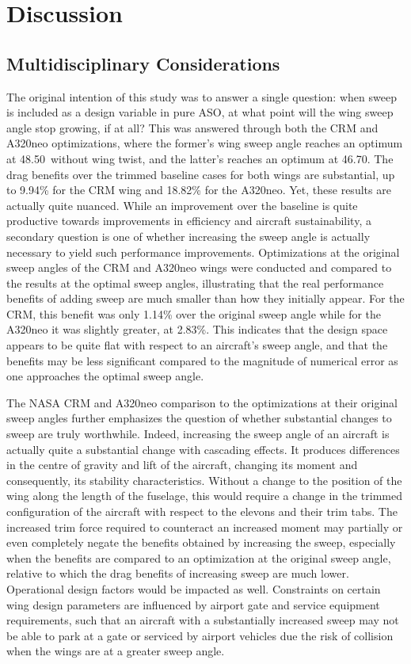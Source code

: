 \chapter{Discussion}
\section{Multidisciplinary Considerations}
The original intention of this study was to answer a single question: when sweep is included as a design variable in pure ASO, at what point will the wing sweep angle stop growing, if at all? This was answered through both the CRM and A320neo optimizations, where the former's wing sweep angle reaches an optimum at 48.50\degree\ without wing twist, and the latter's reaches an optimum at 46.70\degree. The drag benefits over the trimmed baseline cases for both wings are substantial, up to 9.94\% for the CRM wing and 18.82\% for the A320neo. Yet, these results are actually quite nuanced. While an improvement over the baseline is quite productive towards improvements in efficiency and aircraft sustainability, a secondary question is one of whether increasing the sweep angle is actually necessary to yield such performance improvements. Optimizations at the original sweep angles of the CRM and A320neo wings were conducted and compared to the results at the optimal sweep angles, illustrating that the real performance benefits of adding sweep are much smaller than how they initially appear. For the CRM, this benefit was only 1.14\% over the original sweep angle while for the A320neo it was slightly greater, at 2.83\%. This indicates that the design space appears to be quite flat with respect to an aircraft's sweep angle, and that the benefits may be less significant compared to the magnitude of numerical error as one approaches the optimal sweep angle.

The NASA CRM and A320neo comparison to the optimizations at their original sweep angles further emphasizes the question of whether substantial changes to sweep are truly worthwhile. Indeed, increasing the sweep angle of an aircraft is actually quite a substantial change with cascading effects. It produces differences in the centre of gravity and lift of the aircraft, changing its moment and consequently, its stability characteristics. Without a change to the position of the wing along the length of the fuselage, this would require a change in the trimmed configuration of the aircraft with respect to the elevons and their trim tabs. The increased trim force required to counteract an increased moment may partially or even completely negate the benefits obtained by increasing the sweep, especially when the benefits are compared to an optimization at the original sweep angle, relative to which the drag benefits of increasing sweep are much lower. Operational design factors would be impacted as well. Constraints on certain wing design parameters are influenced by airport gate and service equipment requirements, such that an aircraft with a substantially increased sweep may not be able to park at a gate or serviced by airport vehicles due the risk of collision when the wings are at a greater sweep angle.

